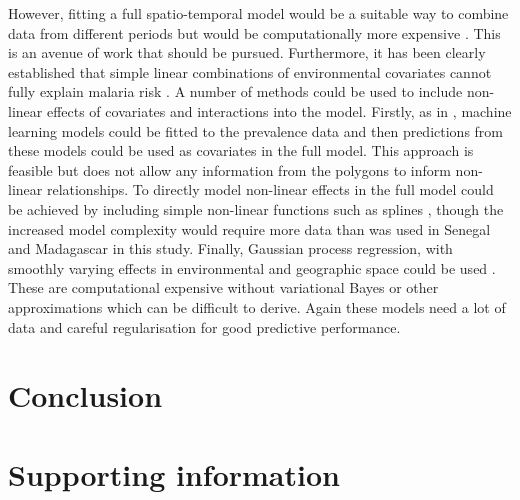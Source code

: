 \documentclass[10pt,letterpaper]{article}
\begin{document}
However, fitting a full spatio-temporal model would be a suitable way to combine data from different periods but would be computationally more expensive \cite{bhatt2015effect, taylor2017continuous}.
This is an avenue of work that should be pursued.
Furthermore, it has been clearly established that simple linear combinations of environmental covariates cannot fully explain malaria risk \cite{bhatt2017improved}.
A number of methods could be used to include non-linear effects of covariates and interactions into the model.
Firstly, as in \cite{bhatt2017improved}, machine learning models could be fitted to the prevalence data and then predictions from these models could be used as covariates in the full model.
This approach is feasible but does not allow any information from the polygons to inform non-linear relationships.
To directly model non-linear effects in the full model could be achieved by including simple non-linear functions such as splines \cite{sissoko2017temporal, sewe2017using, hundessa2018projecting}, though the increased model complexity would require more data than was used in Senegal and Madagascar in this study.
Finally, Gaussian process regression, with smoothly varying effects in environmental and geographic space could be used \cite{law2018variational}.
These are computational expensive without variational Bayes or other approximations \cite{law2018variational,  randomFourier} which can be difficult to derive.
Again these models need a lot of data and careful regularisation for good predictive performance.





\section*{Conclusion}





\section*{Supporting information}

\end{document}
